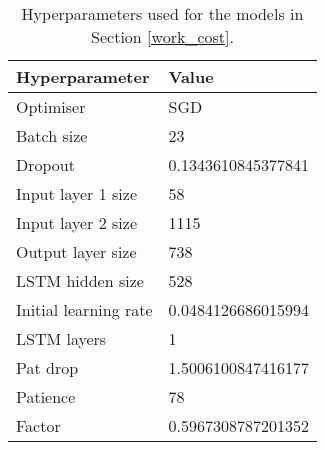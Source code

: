 \begin{table}[h]
	\centering
	\begin{tabular}{l | l}
		Hyperparameter & Value \\
		\hline
		Optimiser & SGD \\
		Batch size & 23 \\
		Dropout & 0.1343610845377841 \\
		Input layer 1 size & 58 \\
		Input layer 2 size & 1115 \\
		Output layer size & 738 \\
		LSTM hidden size & 528 \\
		Initial learning rate & 0.0484126686015994 \\
		LSTM layers & 1 \\
		Pat drop & 1.5006100847416177 \\
		Patience & 78 \\
		Factor & 0.5967308787201352
	\end{tabular}
	\caption{Hyperparameters used for the models in Section \ref{work_cost}.}
	\label{hyperparams_work_cost}
\end{table}
